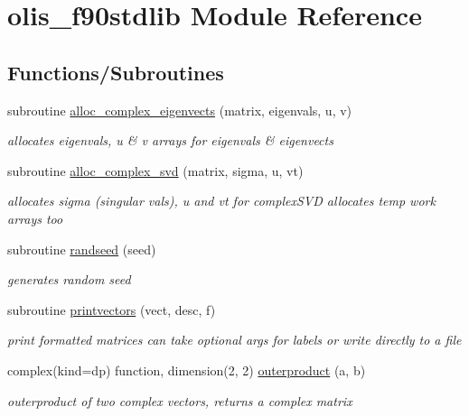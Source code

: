 \hypertarget{namespaceolis__f90stdlib}{}\section{olis\+\_\+f90stdlib Module Reference}
\label{namespaceolis__f90stdlib}
\subsection*{Functions/\+Subroutines}
\begin{DoxyCompactItemize}
\item 
subroutine \hyperlink{namespaceolis__f90stdlib_af0119bd404337367bc0727decf6dd89c}{alloc\+\_\+complex\+\_\+eigenvects} (matrix, eigenvals, u, v)
\begin{DoxyCompactList}\small\item\em allocates eigenvals, u \& v arrays for eigenvals \& eigenvects \end{DoxyCompactList}\item 
subroutine \hyperlink{namespaceolis__f90stdlib_a31420ff7579f33919c00c26753b56612}{alloc\+\_\+complex\+\_\+svd} (matrix, sigma, u, vt)
\begin{DoxyCompactList}\small\item\em allocates sigma (singular vals), u and vt for complex\+S\+VD  allocates temp work arrays too \end{DoxyCompactList}\item 
subroutine \hyperlink{namespaceolis__f90stdlib_a560e235cbabaf74da88a2ec97eda5628}{randseed} (seed)
\begin{DoxyCompactList}\small\item\em generates random seed \end{DoxyCompactList}\item 
subroutine \hyperlink{namespaceolis__f90stdlib_a9780b39329025edfdef71ce07e250808}{printvectors} (vect, desc, f)
\begin{DoxyCompactList}\small\item\em print formatted matrices  can take optional args for labels or write directly to a file \end{DoxyCompactList}\item 
complex(kind=dp) function, dimension(2, 2) \hyperlink{namespaceolis__f90stdlib_a9b646e61678500e78a9c48747a07bdf0}{outerproduct} (a, b)
\begin{DoxyCompactList}\small\item\em outerproduct of two complex vectors, returns a complex matrix \end{DoxyCompactList}\item 

\end{DoxyCompactItemize}
